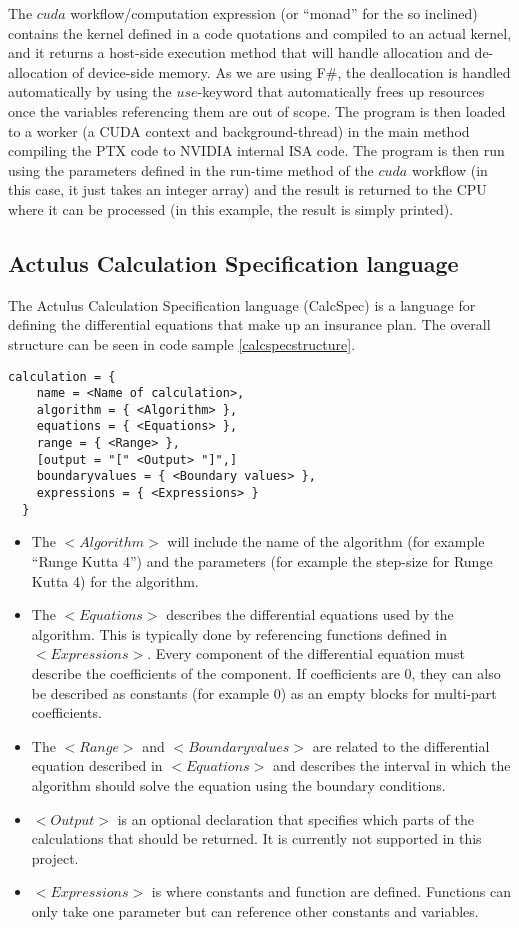 {The $cuda$ workflow/computation expression (or ``monad'' for the so inclined) contains the kernel defined in a code quotations and compiled to an actual kernel, and it returns a host-side execution method that will handle allocation and de-allocation of device-side memory. 
As we are using F\#, the deallocation is handled automatically by using the $use$-keyword that automatically frees up resources once the variables referencing them are out of scope. 
The program is then loaded to a worker (a CUDA context and background-thread) in the main method compiling the PTX code to NVIDIA internal ISA code. %
The program is then run using the parameters defined in the run-time method of the $cuda$ workflow (in this case, it just takes an integer array) and the result is returned to the CPU where it can be processed (in this example, the result is simply printed).

\subsection{Actulus Calculation Specification language}
The Actulus Calculation Specification language (CalcSpec) is a language for defining the differential equations that make up an insurance plan. The overall structure can be seen in code sample \ref{calcspecstructure}.


\begin{lstlisting}[caption=CalcSpec structure, label=calcspecstructure]
calculation = {
    name = <Name of calculation>,
    algorithm = { <Algorithm> },
    equations = { <Equations> },
    range = { <Range> },
    [output = "[" <Output> "]",]
    boundaryvalues = { <Boundary values> },
    expressions = { <Expressions> }
  }
\end{lstlisting}

\begin{itemize}
\item The $<Algorithm>$ will include the name of the algorithm (for example ``Runge Kutta 4'') and the parameters (for example the step-size for Runge Kutta 4) for the algorithm.
\item The $<Equations>$ describes the differential equations used by the algorithm. This is typically done by referencing functions defined in $<Expressions>$. Every component of the differential equation must describe the coefficients of the component. If coefficients are 0, they can also be described as constants (for example 0) as an empty blocks for multi-part coefficients.
\item The $<Range>$ and $<Boundary values>$ are related to the differential equation described in $<Equations>$ and describes the interval in which the algorithm should solve the equation using the boundary conditions.
\item $<Output>$ is an optional declaration that specifies which parts of the calculations that should be returned. It is currently not supported in this project. %
\item $<Expressions>$ is where constants and function are defined. Functions can only take one parameter but can reference other constants and variables.
\end{itemize}

}

